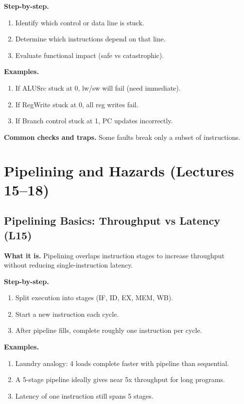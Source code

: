 \documentclass[11pt]{article}
\begin{document}
\textbf{Step-by-step.}
\begin{enumerate}[leftmargin=*]
  \item Identify which control or data line is stuck.
  \item Determine which instructions depend on that line.
  \item Evaluate functional impact (safe vs catastrophic).
\end{enumerate}

\textbf{Examples.}
\begin{enumerate}[leftmargin=*]
  \item If ALUSrc stuck at 0, lw/sw will fail (need immediate).
  \item If RegWrite stuck at 0, all reg writes fail.
  \item If Branch control stuck at 1, PC updates incorrectly.
\end{enumerate}

\textbf{Common checks and traps.} Some faults break only a subset of instructions.

\section{Pipelining and Hazards (Lectures 15--18)}

\subsection{Pipelining Basics: Throughput vs Latency (L15)}
\textbf{What it is.} Pipelining overlaps instruction stages to increase throughput without reducing single-instruction latency.

\textbf{Step-by-step.}
\begin{enumerate}[leftmargin=*]
  \item Split execution into stages (IF, ID, EX, MEM, WB).
  \item Start a new instruction each cycle.
  \item After pipeline fills, complete roughly one instruction per cycle.
\end{enumerate}

\textbf{Examples.}
\begin{enumerate}[leftmargin=*]
  \item Laundry analogy: 4 loads complete faster with pipeline than sequential.
  \item A 5-stage pipeline ideally gives near 5x throughput for long programs.
  \item Latency of one instruction still spans 5 stages.
\end{enumerate}
\end{document}
